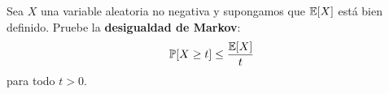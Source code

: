 \begin{statement}{13}
  Sea $X$ una variable aleatoria no negativa y supongamos que $\mathbb{E}[X]$ est\'a bien definido.
  Pruebe la \textbf{desigualdad de Markov}:
  \[
    \mathbb{P}[X \geq t] \leq \frac{\mathbb{E}[X]}{t}
  \]
  para todo $t > 0$.
\end{statement}